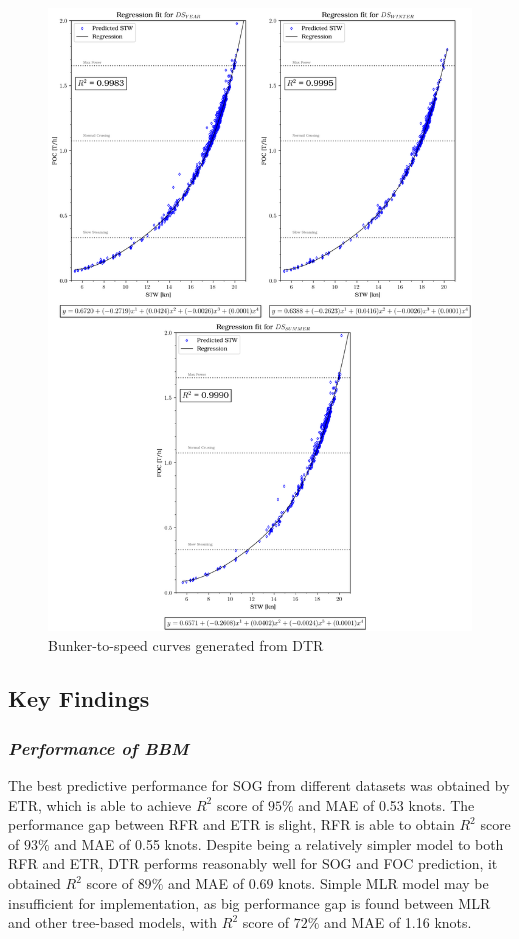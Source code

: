 \begin{figure}[h!]
    \centering
    \includegraphics[width=.9\linewidth]{02_figures/poly_dtr_combi.png}
    \caption{Bunker-to-speed curves generated from DTR}
    \label{fig:FOC_plot_dtr_combi}
\end{figure}

\newpage

\subsection{Key Findings}\label{sec:key_findings}

\subsubsection*{\emph{Performance of BBM}}

The best predictive performance for SOG from different datasets was obtained by ETR, which is able to achieve $R^2$ score of $95\%$ and MAE of 0.53 knots. The performance gap between RFR and ETR is slight, RFR is able to obtain $R^2$ score of $93\%$ and MAE of 0.55 knots. Despite being a relatively simpler model to both RFR and ETR, DTR performs reasonably well for SOG and FOC prediction, it obtained $R^2$ score of $89\%$ and MAE of 0.69 knots. Simple MLR model may be insufficient for implementation, as big performance gap is found between MLR and other tree-based models, with $R^2$ score of $72\%$ and MAE of 1.16 knots.\\


